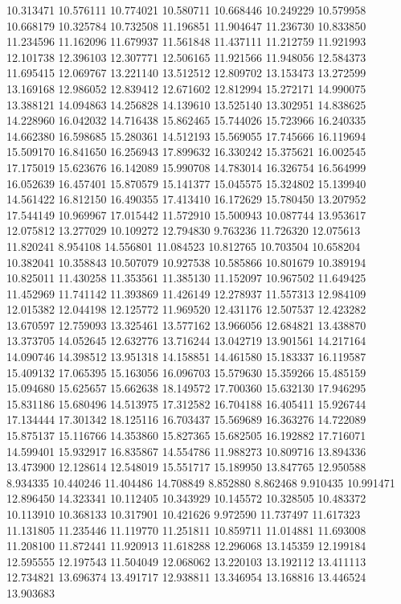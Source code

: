10.313471
10.576111
10.774021
10.580711
10.668446
10.249229
10.579958
10.668179
10.325784
10.732508
11.196851
11.904647
11.236730
10.833850
11.234596
11.162096
11.679937
11.561848
11.437111
11.212759
11.921993
12.101738
12.396103
12.307771
12.506165
11.921566
11.948056
12.584373
11.695415
12.069767
13.221140
13.512512
12.809702
13.153473
13.272599
13.169168
12.986052
12.839412
12.671602
12.812994
15.272171
14.990075
13.388121
14.094863
14.256828
14.139610
13.525140
13.302951
14.838625
14.228960
16.042032
14.716438
15.862465
15.744026
15.723966
16.240335
14.662380
16.598685
15.280361
14.512193
15.569055
17.745666
16.119694
15.509170
16.841650
16.256943
17.899632
16.330242
15.375621
16.002545
17.175019
15.623676
16.142089
15.990708
14.783014
16.326754
16.564999
16.052639
16.457401
15.870579
15.141377
15.045575
15.324802
15.139940
14.561422
16.812150
16.490355
17.413410
16.172629
15.780450
13.207952
17.544149
10.969967
17.015442
11.572910
15.500943
10.087744
13.953617
12.075812
13.277029
10.109272
12.794830
9.763236
11.726320
12.075613
11.820241
8.954108
14.556801
11.084523
10.812765
10.703504
10.658204
10.382041
10.358843
10.507079
10.927538
10.585866
10.801679
10.389194
10.825011
11.430258
11.353561
11.385130
11.152097
10.967502
11.649425
11.452969
11.741142
11.393869
11.426149
12.278937
11.557313
12.984109
12.015382
12.044198
12.125772
11.969520
12.431176
12.507537
12.423282
13.670597
12.759093
13.325461
13.577162
13.966056
12.684821
13.438870
13.373705
14.052645
12.632776
13.716244
13.042719
13.901561
14.217164
14.090746
14.398512
13.951318
14.158851
14.461580
15.183337
16.119587
15.409132
17.065395
15.163056
16.096703
15.579630
15.359266
15.485159
15.094680
15.625657
15.662638
18.149572
17.700360
15.632130
17.946295
15.831186
15.680496
14.513975
17.312582
16.704188
16.405411
15.926744
17.134444
17.301342
18.125116
16.703437
15.569689
16.363276
14.722089
15.875137
15.116766
14.353860
15.827365
15.682505
16.192882
17.716071
14.599401
15.932917
16.835867
14.554786
11.988273
10.809716
13.894336
13.473900
12.128614
12.548019
15.551717
15.189950
13.847765
12.950588
8.934335
10.440246
11.404486
14.708849
8.852880
8.862468
9.910435
10.991471
12.896450
14.323341
10.112405
10.343929
10.145572
10.328505
10.483372
10.113910
10.368133
10.317901
10.421626
9.972590
11.737497
11.617323
11.131805
11.235446
11.119770
11.251811
10.859711
11.014881
11.693008
11.208100
11.872441
11.920913
11.618288
12.296068
13.145359
12.199184
12.595555
12.197543
11.504049
12.068062
13.220103
13.192112
13.411113
12.734821
13.696374
13.491717
12.938811
13.346954
13.168816
13.446524
13.903683

